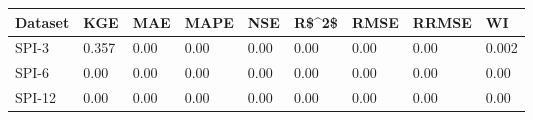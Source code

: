 \begin{tabular}{lllllllll}
\toprule
Dataset &   KGE &  MAE & MAPE &  NSE & R\$\textasciicircum 2\$ & RMSE & RRMSE &    WI \\
\midrule
  SPI-3 & 0.357 & 0.00 & 0.00 & 0.00 &  0.00 & 0.00 &  0.00 & 0.002 \\
  SPI-6 &  0.00 & 0.00 & 0.00 & 0.00 &  0.00 & 0.00 &  0.00 &  0.00 \\
 SPI-12 &  0.00 & 0.00 & 0.00 & 0.00 &  0.00 & 0.00 &  0.00 &  0.00 \\
\bottomrule
\end{tabular}
